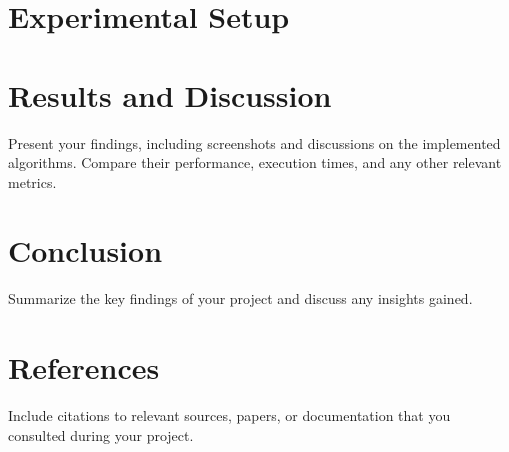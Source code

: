 \documentclass[10pt,twocolumn]{article}
\begin{document}
\section*{Experimental Setup}

\section*{Results and Discussion}
Present your findings, including screenshots and discussions on the implemented algorithms. Compare their performance, execution times, and any other relevant metrics.

\section*{Conclusion}
Summarize the key findings of your project and discuss any insights gained.

\section*{References}
Include citations to relevant sources, papers, or documentation that you consulted during your project.
\end{document}
